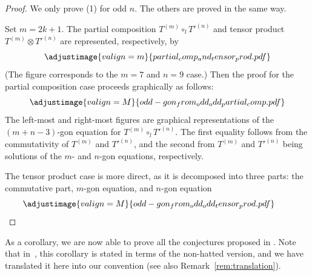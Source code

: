 \documentclass[pdftex]{sigma}
\numberwithin{equation}{section}
\theoremstyle{definition}
\begin{document}
\begin{proof}
We only prove (1) for odd $n$. The others are proved in the same way.

Set $m=2k+1$. The partial composition $T^{(m)}\circ_lT'^{(n)}$ and tensor product $T^{(m)}\otimes T'^{(n)}$ are represented, respectively, by
 \begin{equation*}
 \adjustimage{valign=m}{partial_comp_and_tensor_prod.pdf}
 \end{equation*}
(The figure corresponds to the $m=7$ and $n=9$ case.) Then the proof for the partial composition case proceeds graphically as follows:
 \begin{equation*}
 \adjustimage{valign=M}{odd-gon_from_odd_odd_partial_comp.pdf}
 \end{equation*}
 The left-most and right-most figures are graphical representations of the $(m+n-3)$-gon equation for $T^{(m)}\circ_lT'^{(n)}$. The first equality follows from the commutativity of $T^{(m)}$ and $T'^{(n)}$, and the second from $T^{(m)}$ and $T'^{(n)}$ being solutions of the $m$- and $n$-gon equations, respectively.

 The tensor product case is more direct, as it is decomposed into three parts: the commutative part, $m$-gon equation, and $n$-gon equation
 \begin{equation*}
 \adjustimage{valign=M}{odd-gon_from_odd_odd_tensor_prod.pdf}\tag*{\qed}
 \end{equation*}\renewcommand{\qed}{}
\end{proof}

As a corollary, we are now able to prove all the conjectures proposed in \cite{muller2024structure}. Note that in~\cite{muller2024structure}, this corollary is stated in terms of the non-hatted version, and we have translated it here into our convention (see also Remark~\ref{rem:translation}).
\end{document}
